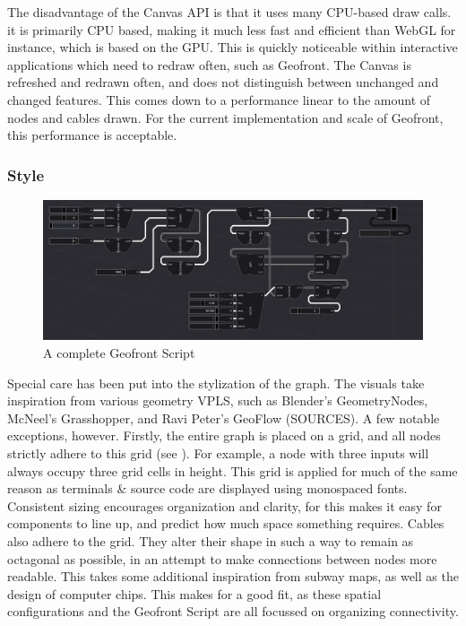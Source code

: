 The disadvantage of the Canvas API is that it uses many CPU-based draw calls. it is primarily CPU based, 
making it much less fast and efficient than WebGL for instance, which is based on the GPU. 
This is quickly noticeable within interactive applications which need to redraw often, such as Geofront. 
The Canvas is refreshed and redrawn often, and does not distinguish between unchanged and changed features. 
This comes down to a performance linear to the amount of nodes and cables drawn. For the current implementation and scale of Geofront, this performance is acceptable. 

\subsubsection*{Style}

\begin{figure}
  \centering
  \graphicspath{ {../../assets/images/implementation/} }
  \includegraphics[width=\linewidth]{a-full-graph.png}
  \caption[Shim Classes]{A complete Geofront Script}
  \label{fig:a-full-graph}
\end{figure}

Special care has been put into the stylization of the graph.
The visuals take inspiration from various geometry VPLS, such as Blender's GeometryNodes, McNeel's Grasshopper, and Ravi Peter's GeoFlow (SOURCES). 
A few notable exceptions, however. 
Firstly, the entire graph is placed on a grid, and all nodes strictly adhere to this grid (see ). 
For example, a node with three inputs will always occupy three grid cells in height. 
This grid is applied for much of the same reason as terminals \& source code are displayed using monospaced fonts. 
Consistent sizing encourages organization and clarity, for this makes it easy for components to line up, and predict how much space something requires.  
Cables also adhere to the grid. They alter their shape in such a way to remain as octagonal as possible, in an attempt to make connections between nodes more readable.
This takes some additional inspiration from subway maps, as well as the design of computer chips. 
This makes for a good fit, as these spatial configurations and the Geofront Script are all focussed on organizing connectivity.

